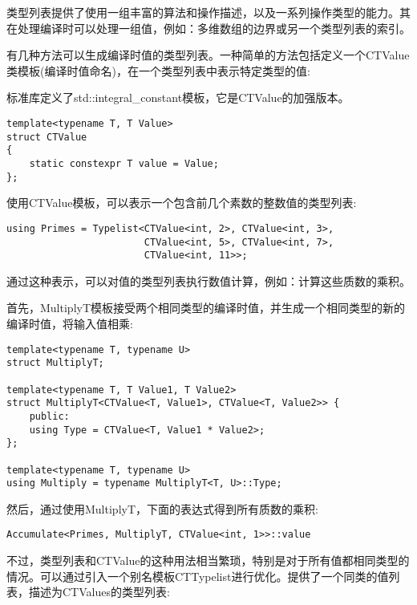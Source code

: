 
类型列表提供了使用一组丰富的算法和操作描述，以及一系列操作类型的能力。其在处理编译时可以处理一组值，例如：多维数组的边界或另一个类型列表的索引。

有几种方法可以生成编译时值的类型列表。一种简单的方法包括定义一个CTValue类模板(编译时值命名)，在一个类型列表中表示特定类型的值:

\begin{tcolorbox}[colback=webgreen!5!white,colframe=webgreen!75!black]
\hspace*{0.75cm}标准库定义了std::integral\_constant模板，它是CTValue的加强版本。
\end{tcolorbox}

\begin{lstlisting}[style=styleCXX]
template<typename T, T Value>
struct CTValue
{
	static constexpr T value = Value;
};
\end{lstlisting}

使用CTValue模板，可以表示一个包含前几个素数的整数值的类型列表:

\begin{lstlisting}[style=styleCXX]
using Primes = Typelist<CTValue<int, 2>, CTValue<int, 3>,
						CTValue<int, 5>, CTValue<int, 7>,
						CTValue<int, 11>>;
\end{lstlisting}

通过这种表示，可以对值的类型列表执行数值计算，例如：计算这些质数的乘积。

首先，MultiplyT模板接受两个相同类型的编译时值，并生成一个相同类型的新的编译时值，将输入值相乘:

\begin{lstlisting}[style=styleCXX]
template<typename T, typename U>
struct MultiplyT;

template<typename T, T Value1, T Value2>
struct MultiplyT<CTValue<T, Value1>, CTValue<T, Value2>> {
	public:
	using Type = CTValue<T, Value1 * Value2>;
};

template<typename T, typename U>
using Multiply = typename MultiplyT<T, U>::Type;
\end{lstlisting}

然后，通过使用MultiplyT，下面的表达式得到所有质数的乘积:

\begin{lstlisting}[style=styleCXX]
Accumulate<Primes, MultiplyT, CTValue<int, 1>>::value
\end{lstlisting}

不过，类型列表和CTValue的这种用法相当繁琐，特别是对于所有值都相同类型的情况。可以通过引入一个别名模板CTTypelist进行优化。提供了一个同类的值列表，描述为CTValues的类型列表:

